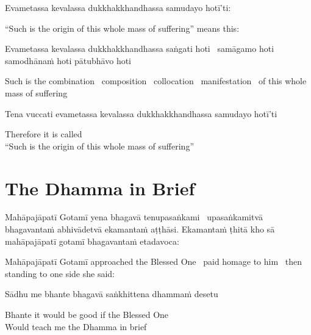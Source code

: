 Evametassa kevalassa dukkhakkhandhassa samudayo hotī’ti:

\begin{cprenglish}
  “Such is the origin of this whole mass of suffering” means this:
\end{cprenglish}

Evametassa kevalassa dukkhakkhandhassa saṅgati hoti \breathmark\ samāgamo hoti samodhānaṁ hoti pātubhāvo hoti

\begin{cprenglish}
  Such is the combination \breathmark\ composition \breathmark\ collocation \breathmark\ manifestation \breathmark\ of this whole mass of suffering
\end{cprenglish}

Tena vuccati evametassa kevalassa dukkhakkhandhassa samudayo hotī’ti

\begin{cprenglish}
  Therefore it is called\\
  “Such is the origin of this whole mass of suffering”
\end{cprenglish}


\clearpage

\section{The Dhamma in Brief}
\label{dhamma-in-brief}

\begin{leader}
\end{leader}

Mahāpajāpatī Gotamī yena bhagavā tenupasaṅkami \breathmark\ upasaṅkamitvā bhagavantaṁ abhivādetvā ekamantaṁ aṭṭhāsi. Ekamantaṁ ṭhitā kho sā mahāpajāpatī gotamī bhagavantaṁ etadavoca:

\begin{cprenglish}
  Mahāpajāpatī Gotamī approached the Blessed One \breathmark\ paid homage to him \breathmark\ then standing to one side she said:
\end{cprenglish}

Sādhu me bhante bhagavā saṅkhittena dhammaṁ desetu

\begin{cprenglish}
  Bhante it would be good if the Blessed One\\
  Would teach me the Dhamma in brief
\end{cprenglish}

